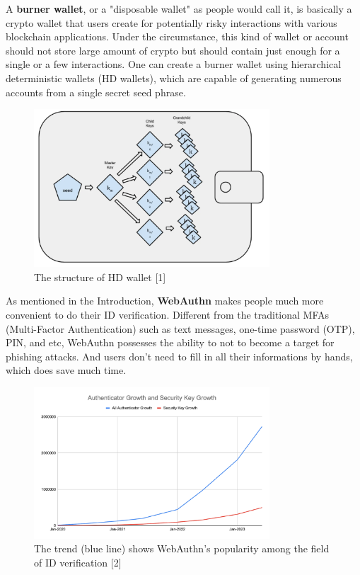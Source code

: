 \documentclass[conference]{IEEEtran}
\begin{document}
A \textbf{burner wallet}, or a "disposable wallet" as people would call it, is basically a crypto wallet 
that users create for potentially risky interactions with various blockchain applications. Under
the circumstance, this kind of wallet or account should not store large amount of crypto but 
should contain just enough for a single or a few interactions. One can create a burner wallet 
using hierarchical deterministic wallets (HD wallets), which are capable of generating numerous accounts
from a single secret seed phrase. 

\begin{figure}[htbp]
    \centerline{\includegraphics[width=250pt]{fig2.png}}\label{fig}
    \caption{The structure of HD wallet [1]}
    \end{figure}

As mentioned in the Introduction, \textbf{WebAuthn} makes people much more convenient to do their 
ID verification. Different from the traditional MFAs (Multi-Factor Authentication) such as text messages,
one-time password (OTP), PIN, and etc, WebAuthn possesses the ability to not to become a target for 
phishing attacks. And users don't need to fill in all their informations by hands, which does save much
time. 

\begin{figure}[htbp]
    \centerline{\includegraphics[width=250pt]{fig3.png}}\label{fig}
    \caption{The trend (blue line) shows WebAuthn's popularity among the field of ID verification [2]}
    \end{figure}
\end{document}
